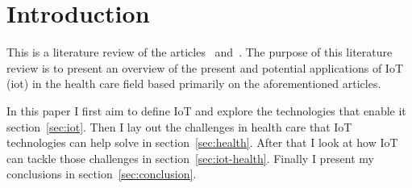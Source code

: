 \section{Introduction}
This is a literature review of the articles~\cite{Bui2011}
and~\cite{Islam2015}. The purpose of this literature review is to present an
overview of the present and potential applications of IoT (\gls{iot}) in the
health care field based primarily on the aforementioned articles.

In this paper I first aim to define IoT and explore the technologies that
enable it section~\ref{sec:iot}. Then I lay out the challenges in health care
that IoT technologies can help solve in section~\ref{sec:health}. After that I
look at how IoT can tackle those challenges in section~\ref{sec:iot-health}.
Finally I present my conclusions in section~\ref{sec:conclusion}.

